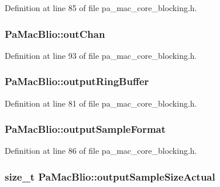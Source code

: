 Definition at line 85 of file pa\+\_\+mac\+\_\+core\+\_\+blocking.\+h.

\subsubsection[{\texorpdfstring{out\+Chan}{outChan}}]{ Pa\+Mac\+Blio\+::out\+Chan}\hypertarget{struct_pa_mac_blio_a67e340aa158be01fa97ba700699e627a}{}\label{struct_pa_mac_blio_a67e340aa158be01fa97ba700699e627a}


Definition at line 93 of file pa\+\_\+mac\+\_\+core\+\_\+blocking.\+h.

\subsubsection[{\texorpdfstring{output\+Ring\+Buffer}{outputRingBuffer}}]{ Pa\+Mac\+Blio\+::output\+Ring\+Buffer}\hypertarget{struct_pa_mac_blio_af6e4305d4f3283d44a6d0a1817f06334}{}\label{struct_pa_mac_blio_af6e4305d4f3283d44a6d0a1817f06334}


Definition at line 81 of file pa\+\_\+mac\+\_\+core\+\_\+blocking.\+h.

\subsubsection[{\texorpdfstring{output\+Sample\+Format}{outputSampleFormat}}]{ Pa\+Mac\+Blio\+::output\+Sample\+Format}\hypertarget{struct_pa_mac_blio_a712ef9ce43a8508c690ccca94a59ae32}{}\label{struct_pa_mac_blio_a712ef9ce43a8508c690ccca94a59ae32}


Definition at line 86 of file pa\+\_\+mac\+\_\+core\+\_\+blocking.\+h.

\subsubsection[{\texorpdfstring{output\+Sample\+Size\+Actual}{outputSampleSizeActual}}]{\setlength{\rightskip}{0pt plus 5cm}size\+\_\+t Pa\+Mac\+Blio\+::output\+Sample\+Size\+Actual}\hypertarget{struct_pa_mac_blio_a825d5ebea6f15c42f389f51ed5b10723}{}\label{struct_pa_mac_blio_a825d5ebea6f15c42f389f51ed5b10723}


